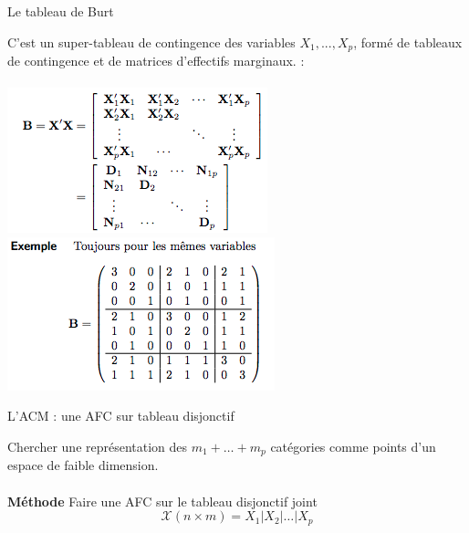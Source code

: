\documentclass[10pt]{beamer}
\begin{document}

\begin{frame}{Le tableau de Burt}

 C'est un super-tableau de contingence des variables
$X_1, . . . , X_p$, formé de tableaux de contingence et de
matrices d'effectifs marginaux. : \\~\\

\centering
\includegraphics[scale=0.5]{Disj4} 
\includegraphics[scale=0.5]{Disj5} 

\end{frame}


\begin{frame}{L'ACM : une AFC sur tableau disjonctif}

Chercher une représentation des $m_1+\ldots+m_p$
catégories comme points d'un espace de faible dimension.\\ ~\\

\textbf{Méthode }  Faire une AFC sur le tableau disjonctif joint   
$$ \mathcal{X}(n \times m)= {X}_1\vert  {X}_2\vert  \ldots  \vert{X}_p $$

 

 

\end{frame}

\end{document}
